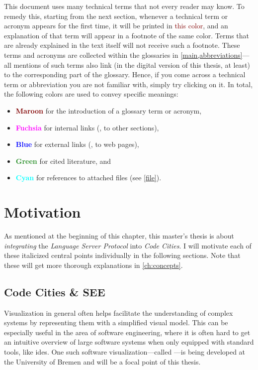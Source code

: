 \documentclass[../thesis]{subfiles}
\begin{document}
This document uses many technical terms that not every reader may know.
To remedy this, starting from the next section, whenever a technical term or acronym appears for the first time, it will be printed in {\textcolor{Maroon}{this color}}, and an explanation of that term will appear in a footnote of the same color.
Terms that are already explained in the text itself will not receive such a footnote.
These terms and acronyms are collected within the glossaries in \cref{main,abbreviations}---all mentions of such terms also link (in the digital version of this thesis, at least) to the corresponding part of the glossary.
Hence, if you come across a technical term or abbreviation you are not familiar with, simply try clicking on it.
In total, the following colors are used to convey specific meanings:
\begin{itemize}
	\item \textbf{\textcolor{Maroon}{Maroon}} for the introduction of a glossary term or acronym,
	\item \textbf{\textcolor{Fuchsia}{Fuchsia}} for internal links (\eg, to other sections),
	\item \textbf{\textcolor{Blue}{Blue}} for external links (\eg, to web pages),
	\item \textbf{\textcolor{ForestGreen}{Green}} for cited literature, and
	\item \textbf{\textcolor{Cyan}{Cyan}} for references to attached files (see \cref{file}).
\end{itemize}

\section{Motivation}
As mentioned at the beginning of this chapter, this master's thesis is about \emph{integrating} the \emph{Language Server Protocol} into \emph{Code Cities}.
I will motivate each of these italicized central points individually in the following sections.
Note that these will get more thorough explanations in \cref{ch:concepts}.

\subsection{Code Cities \& SEE}\label{subsec:see}
Visualization in general often helps facilitate the understanding of complex systems by representing them with a simplified visual model.
This can be especially useful in the area of software engineering, where it is often hard to get an intuitive overview of large software systems when only equipped with standard tools, like \glspl{ide}.
One such software visualization---called \SEE{}---is being developed at the University of Bremen and will be a focal point of this thesis.
\end{document}
